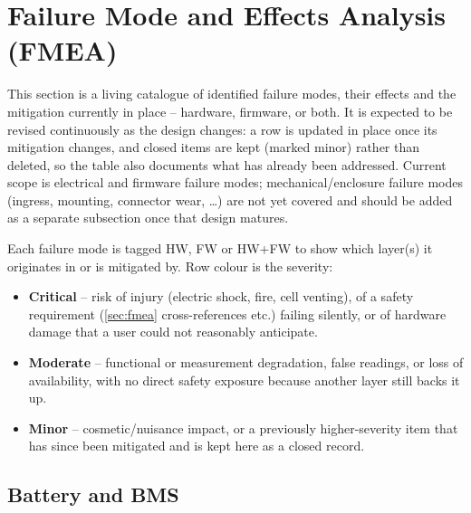 \section{Failure Mode and Effects Analysis (\acs{FMEA})}
\label{sec:fmea}

This section is a living catalogue of identified failure modes, their
effects and the mitigation currently in place -- hardware, firmware, or
both. It is expected to be revised continuously as the design changes: a
row is updated in place once its mitigation changes, and closed items are
kept (marked minor) rather than deleted, so the table also documents what
has already been addressed. Current scope is electrical and firmware
failure modes; mechanical/enclosure failure modes (ingress, mounting,
connector wear, \ldots) are not yet covered and should be added as a
separate subsection once that design matures.

Each failure mode is tagged HW, FW or HW+FW to show
which layer(s) it originates in or is mitigated by. Row colour is the
severity:

\begin{itemize}
    \item \colorbox{lred}{\phantom{xx}} \textbf{Critical} -- risk of injury (electric shock, fire, cell venting), of a safety requirement (\autoref{sec:fmea} cross-references  etc.) failing silently, or of hardware damage that a user could not reasonably anticipate.
    \item \colorbox{orange!30}{\phantom{xx}} \textbf{Moderate} -- functional or measurement degradation, false readings, or loss of availability, with no direct safety exposure because another layer still backs it up.
    \item \colorbox{lgreen}{\phantom{xx}} \textbf{Minor} -- cosmetic/nuisance impact, or a previously higher-severity item that has since been mitigated and is kept here as a closed record.
\end{itemize}

\FloatBarrier

\subsection{Battery and \acs{BMS}}

